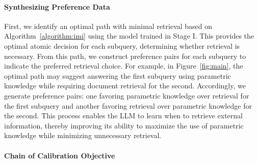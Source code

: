 \paragraph{Synthesizing Preference Data}
First, we identify an optimal path with minimal retrieval based on Algorithm~\ref{algorithm:imi} using the model trained in Stage I. This provides the optimal atomic decision for each subquery, determining whether retrieval is necessary.  
% 
From this path, we construct preference pairs for each subquery to indicate the preferred retrieval choice. For example, in Figure~\ref{fig:main}, the optimal path may suggest answering the first subquery using parametric knowledge while requiring document retrieval for the second. Accordingly, we generate preference pairs: one favoring parametric knowledge over retrieval for the first subquery and another favoring retrieval over parametric knowledge for the second.  
% 
This process enables the LLM to learn when to retrieve external information, thereby improving its ability to maximize the use of parametric knowledge while minimizing unnecessary retrieval.


% 





% 



\paragraph{Chain of Calibration Objective}

